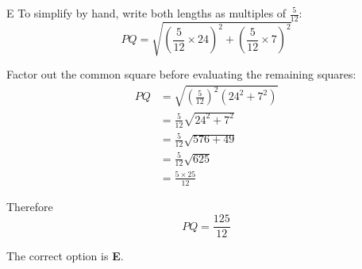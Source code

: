 \documentclass[11pt,a4paper]{article}
\begin{document}
\begin{enumerate}[label=\textbf{\arabic*.},leftmargin=*,itemsep=0pt,start=5]
\begin{djsSolution}{E}
To simplify by hand, write both lengths as multiples of $\frac{5}{12}$:
\[
PQ=\sqrt{\left(\frac{5}{12}\times24\right)^2
+\left(\frac{5}{12}\times7\right)^2}
\]

Factor out the common square before evaluating the remaining squares:
\[
\begin{aligned}
PQ&=\sqrt{\left(\frac{5}{12}\right)^2(24^2+7^2)}\\
&=\frac{5}{12}\sqrt{24^2+7^2}\\
&=\frac{5}{12}\sqrt{576+49}\\
&=\frac{5}{12}\sqrt{625}\\
&=\frac{5\times25}{12}
\end{aligned}
\]

Therefore
\[
PQ=\frac{125}{12}
\]

The correct option is \textbf{E}.
\end{djsSolution}
\end{enumerate}
\clearpage
\thispagestyle{djssolutions}
\vspace*{8pt}
\end{document}
